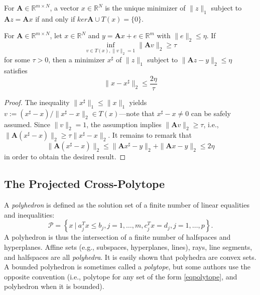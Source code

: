 \begin{theorem}
    \label{th0.4.35}
    For $\mathbf{A} \in \mathbb{R}^{m \times N}$, a vector $x \in \mathbb{R}^N$ is the unique minimizer of $\|z\|_1$ subject to $\mathbf{A}z = \mathbf{A}x$ if and only if $ker\mathbf{A} \cup T(x) = \{0\}$.
\end{theorem}

\begin{theorem}
    \label{th0.4.36}
    For $\mathbf{A} \in \mathbb{R}^{m \times N}$, let $x \in \mathbb{R}^N$ and $y= \mathbf{A}x + e \in \mathbb{R}^m$ with $\|e\|_2 \leq \eta$. If 
    \[
        \inf\limits_{v \in T(x), \|v\|_2=1} \|\mathbf{A}v\|_2 \geq \tau
    \]
    for some $\tau > 0$, then a minimizer $x^{\sharp}$ of $\|z\|_1$ subject to $\|\mathbf{A}z - y\|_2 \leq \eta$ satisfies 
    \begin{equation}
        \|x - x^{\sharp}\|_2 \leq \frac{2\eta}{\tau}
        \label{eq0.4.35}
    \end{equation}
\end{theorem}

\begin{proof}
    The inequality $\|x^{\sharp}\|_1 \leq \|x\|_1$ yields $v := (x^{\sharp} - x)/ \|x^{\sharp} - x\|_2 \in T(x)$---note that $x^{\sharp} - x \neq 0$ can be safely assumed. Since $\|v\|_2 = 1$, the assumption implies $\|\mathbf{A}v\|_2 \geq \tau$, i.e., $\|\mathbf{A}(x^{\sharp} - x)\|_2 \geq \tau \|x^{\sharp} - x\|_2$. It remains to remark that
    \[
        \|\mathbf{A}(x^{\sharp} - x)\|_2 \leq \|\mathbf{A}x^{\sharp} - y\|_2 + \|\mathbf{A}x - y\|_2 \leq 2\eta
    \]
    in order to obtain the desired result.
\end{proof}

\subsection{The Projected Cross-Polytope}
\begin{mdframed}
    \label{polytope}
    A \emph{\textcolor[rgb]{1,0,0}{polyhedron}} is defined as the solution set of a finite number of linear equalities and inequalities:
    \label{eqpolytope}
    \[
        \mathcal{P} = \left\{ x \ | \ a_j^T x \leq b_j, j =1,\dots,m, c_j^T x = d_j, j =1,\dots,p \right\}.
    \]
    A polyhedron is thus the intersection of a finite number of halfspaces and hyperplanes. Affine sets (e.g., subspaces, hyperplanes, lines), rays, line segments, and halfspaces are all \emph{\textcolor[rgb]{1,0,0}{polyhedra}}. It is easily shown that polyhedra are convex sets. A bounded polyhedron is sometimes called a \emph{\textcolor[rgb]{1,0,0}{polytope}}, but some authors use the opposite convention (i.e., polytope for any set of the form \cref{eqpolytope}, and polyhedron when it is bounded).
\end{mdframed}

